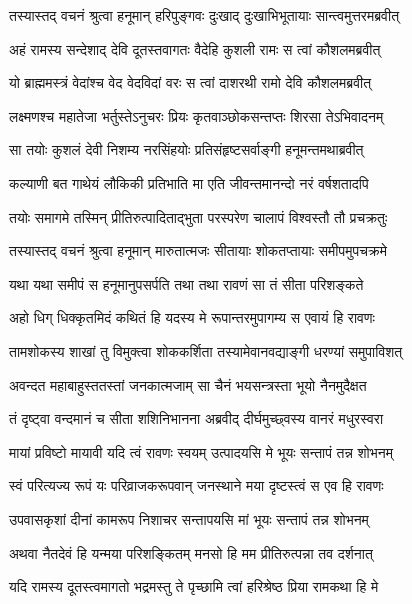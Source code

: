 
\twolineshloka
{तस्यास्तद् वचनं श्रुत्वा हनूमान् हरिपुङ्गवः}
{दुःखाद् दुःखाभिभूतायाः सान्त्वमुत्तरमब्रवीत्} %

\twolineshloka
{अहं रामस्य सन्देशाद् देवि दूतस्तवागतः}
{वैदेहि कुशली रामः स त्वां कौशलमब्रवीत्} %

\twolineshloka
{यो ब्राह्ममस्त्रं वेदांश्च वेद वेदविदां वरः}
{स त्वां दाशरथी रामो देवि कौशलमब्रवीत्} %

\twolineshloka
{लक्ष्मणश्च महातेजा भर्तुस्तेऽनुचरः प्रियः}
{कृतवाञ्छोकसन्तप्तः शिरसा तेऽभिवादनम्} %

\twolineshloka
{सा तयोः कुशलं देवी निशम्य नरसिंहयोः}
{प्रतिसंहृष्टसर्वाङ्गी हनूमन्तमथाब्रवीत्} %

\twolineshloka
{कल्याणी बत गाथेयं लौकिकी प्रतिभाति मा}
{एति जीवन्तमानन्दो नरं वर्षशतादपि} %

\twolineshloka
{तयोः समागमे तस्मिन् प्रीतिरुत्पादिताद्भुता}
{परस्परेण चालापं विश्वस्तौ तौ प्रचक्रतुः} %

\twolineshloka
{तस्यास्तद् वचनं श्रुत्वा हनूमान् मारुतात्मजः}
{सीतायाः शोकतप्तायाः समीपमुपचक्रमे} %

\twolineshloka
{यथा यथा समीपं स हनूमानुपसर्पति}
{तथा तथा रावणं सा तं सीता परिशङ्कते} %

\twolineshloka
{अहो धिग् धिक्कृतमिदं कथितं हि यदस्य मे}
{रूपान्तरमुपागम्य स एवायं हि रावणः} %

\twolineshloka
{तामशोकस्य शाखां तु विमुक्त्वा शोककर्शिता}
{तस्यामेवानवद्याङ्गी धरण्यां समुपाविशत्} %

\twolineshloka
{अवन्दत महाबाहुस्ततस्तां जनकात्मजाम्}
{सा चैनं भयसन्त्रस्ता भूयो नैनमुदैक्षत} %

\twolineshloka
{तं दृष्ट्वा वन्दमानं च सीता शशिनिभानना}
{अब्रवीद् दीर्घमुच्छ्वस्य वानरं मधुरस्वरा} %

\twolineshloka
{मायां प्रविष्टो मायावी यदि त्वं रावणः स्वयम्}
{उत्पादयसि मे भूयः सन्तापं तन्न शोभनम्} %

\twolineshloka
{स्वं परित्यज्य रूपं यः परिव्राजकरूपवान्}
{जनस्थाने मया दृष्टस्त्वं स एव हि रावणः} %

\twolineshloka
{उपवासकृशां दीनां कामरूप निशाचर}
{सन्तापयसि मां भूयः सन्तापं तन्न शोभनम्} %

\twolineshloka
{अथवा नैतदेवं हि यन्मया परिशङ्कितम्}
{मनसो हि मम प्रीतिरुत्पन्ना तव दर्शनात्} %

\twolineshloka
{यदि रामस्य दूतस्त्वमागतो भद्रमस्तु ते}
{पृच्छामि त्वां हरिश्रेष्ठ प्रिया रामकथा हि मे} %

